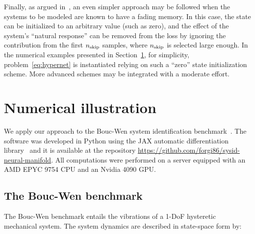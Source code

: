 \documentclass{article}
\begin{document}
Finally, as argued in~\cite{forgione2022learning}, an even simpler approach may be followed when the systems to be modeled are known to have a fading memory. In this case, the state can be initialized to an arbitrary value (such as zero), and the effect of the system's ``natural response'' can be removed from the loss by ignoring the contribution from the first $n_{\rm skip}$ samples, where $n_{\rm skip}$ is selected large enough. In the numerical examples presented in Section~\ref{sec:examples}, for simplicity, problem~\eqref{eq:hypernet} is instantiated relying on such a ``zero'' state initialization scheme. More advanced schemes may be integrated with a moderate effort.

\section{Numerical illustration}
\label{sec:examples}
We apply our approach to the Bouc-Wen system identification benchmark~\cite{noel2016hysteretic}. 
The software was developed in Python using the JAX automatic differentiation library~\cite{JAX} and it is available at the repository \url{https://github.com/forgi86/sysid-neural-manifold}. All computations were performed on a server equipped with an AMD EPYC 9754 CPU and an Nvidia 4090 GPU.

\subsection{The Bouc-Wen benchmark}
The Bouc-Wen benchmark entails the vibrations of a 1-DoF hysteretic mechanical system. The system dynamics are described in state-space form by:
\end{document}
